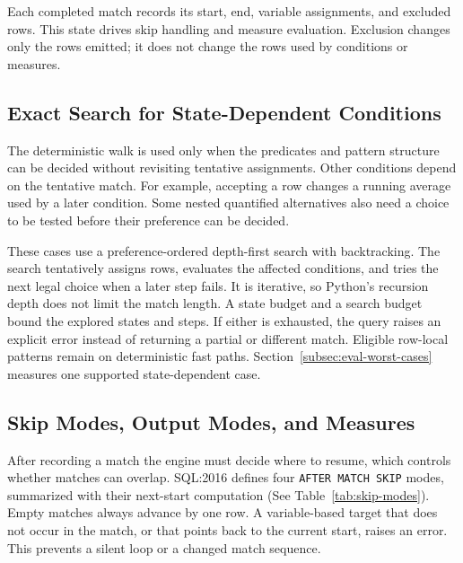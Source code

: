 Each completed match records its start, end, variable assignments, and
excluded rows.  This state drives skip handling and measure evaluation.
Exclusion changes only the rows emitted; it does not change the rows
used by conditions or measures.

\subsection{Exact Search for State-Dependent Conditions}
\label{subsec:meth-exec-backtracking}

The deterministic walk is used only when the predicates and pattern
structure can be decided without revisiting tentative assignments.
Other conditions depend on the tentative match.  For example,
accepting a row changes a running average used by a later condition.
Some nested quantified alternatives also need a choice to be tested
before their preference can be decided.

These cases use a preference-ordered depth-first search with
backtracking.  The search tentatively assigns rows, evaluates the
affected conditions, and tries the next legal choice when a later step
fails.  It is iterative, so Python's recursion depth does not limit the
match length.  A state budget and a search budget bound the explored states and
steps.  If either is exhausted, the query raises an
explicit error instead of returning a partial or different match.
Eligible row-local patterns remain on deterministic fast paths.
Section~\ref{subsec:eval-worst-cases} measures one supported
state-dependent case.

\subsection{Skip Modes, Output Modes, and Measures}
\label{subsec:meth-exec-output}

After recording a match the engine must decide where to resume, which
controls whether matches can overlap.  SQL:2016 defines four
\texttt{AFTER MATCH SKIP} modes, summarized with their next-start
computation (See Table~\ref{tab:skip-modes}).  Empty matches always
advance
by one row.  A variable-based target that does not occur in the match,
or that points back to the current start, raises an error.  This
prevents a silent loop or a changed match sequence.

